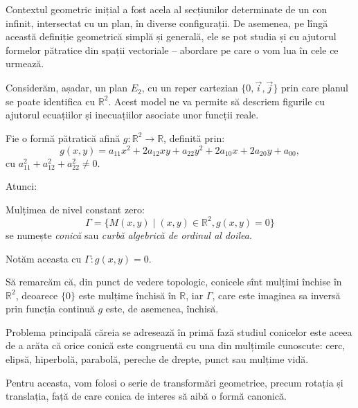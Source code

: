 Contextul geometric inițial a fost acela al secțiunilor determinate de un con
infinit, intersectat cu un plan, în diverse configurații. De asemenea, pe lîngă
această definiție geometrică simplă și generală, ele se pot studia și cu 
ajutorul formelor pătratice din spații vectoriale -- abordare pe care o vom lua
în cele ce urmează.

Considerăm, așadar, un plan $E_2$, cu un reper cartezian $\{0,\vec{i},\vec{j}\}$
prin care planul se poate identifica cu $\mathbb{R}^2$. Acest model ne va 
permite să descriem figurile cu ajutorul ecuațiilor și inecuațiilor asociate
unor funcții reale.

Fie o formă pătratică afină $g : \mathbb{R}^2 \to \mathbb{R}$, definită prin: 
 \[
	g(x,y) = a_{11} x^2 + 2a_{12}xy + a_{22}y^2 + 2a_{10}x + 2a_{20}y + a_{00},
\]
cu $a_{11}^2 + a_{12}^2 + a_{22}^2 \neq 0$.

Atunci:

\begin{definition}

	Mulțimea de nivel constant zero: 
 \[
    \Gamma = \{M(x,y) \mid (x,y) \in \mathbb{R}^2, g(x,y) = 0 \}
\]
se numește \emph{conică} sau \emph{curbă algebrică de ordinul al doilea}.

Notăm aceasta cu $\Gamma: g(x,y) = 0$.
\end{definition}

Să remarcăm că, din punct de vedere topologic, conicele sînt mulțimi închise
în $\mathbb{R}^2$, deoarece $\{0\}$ este mulțime închisă în $\mathbb{R}$, iar
$\Gamma$, care este imaginea sa inversă prin funcția continuă $g$ este, de
asemenea, închisă.

Problema principală căreia se adresează în primă fază studiul conicelor este 
aceea de a arăta că orice conică este congruentă cu una din mulțimile cunoscute:
cerc, elipsă, hiperbolă, parabolă, pereche de drepte, punct sau mulțime vidă.

Pentru aceasta, vom folosi o serie de transformări geometrice, precum rotația
și translația, față de care conica de interes să aibă o formă canonică.

